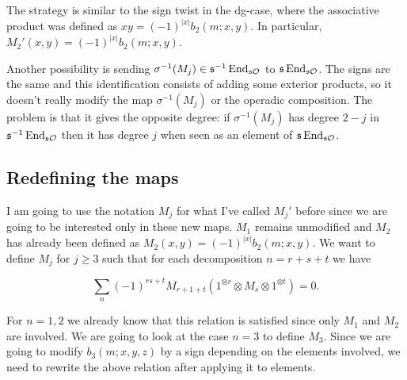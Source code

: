 \documentclass[twoside]{article}
\begin{document}
The strategy is similar to the sign twist in the dg-case, where the associative product was defined as $xy=(-1)^{|x|}b_2(m;x,y)$. In particular, $M_2'(x,y)=(-1)^{|x|}b_2(m;x,y)$.

\begin{remark}
Another possibility is sending $\sigma^{-1}(M_j)\in\mathfrak{s}^{-1}\operatorname{End}_{\mathfrak{s}{\mathcal O}}$ to $\mathfrak{s}\operatorname{End}_{\mathfrak{s}{\mathcal O}}$. The signs are the same and this identification consists of adding some exterior products, so it doesn't really modify the map $\sigma^{-1}(M_j)$ or the operadic composition. The problem is that it gives the opposite degree: if $\sigma^{-1}(M_j)$ has degree $2-j$ in $\mathfrak{s}^{-1}\operatorname{End}_{\mathfrak{s}{\mathcal O}}$ then it has degree $j$ when seen as an element of $\mathfrak{s}\operatorname{End}_{\mathfrak{s}{\mathcal O}}$.
\end{remark}

\subsection{Redefining the maps}
I am going to use the notation $M_j$ for what I've called $M_j'$ before since we are going to be interested only in these new maps. $M_1$ remains unmodified and $M_2$ has already been defined as $M_2(x,y)=(-1)^{|x|}b_2(m;x,y)$. We want to define $M_j$ for $j\geq 3$ such that for each decomposition $n=r+s+t$ we have

$$\sum_n (-1)^{rs+t}M_{r+1+t}(1^{\otimes r}\otimes M_s\otimes 1^{\otimes t})=0.$$

For $n=1,2$ we already know that this relation is satisfied since only $M_1$ and $M_2$ are involved. We are going to look at the case $n=3$ to define $M_3$. Since we are going to modify $b_3(m;x,y,z)$ by a sign depending on the elements involved, we need to rewrite the above relation after applying it to elements. 
\end{document}
